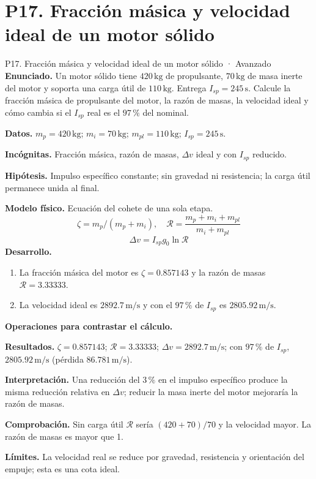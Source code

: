 \section{P17. Fracción másica y velocidad ideal de un motor sólido}
\begin{studiumworked}{P17. Fracción másica y velocidad ideal de un motor sólido · Avanzado}
\textbf{Enunciado.} Un motor sólido tiene $420\,\mathrm{kg}$ de propulsante, $70\,\mathrm{kg}$ de masa inerte del motor y soporta una carga útil de $110\,\mathrm{kg}$. Entrega $I_{sp}=245\,\mathrm s$. Calcule la fracción másica de propulsante del motor, la razón de masas, la velocidad ideal y cómo cambia si el $I_{sp}$ real es el $97\,\%$ del nominal.

\textbf{Datos.} $m_p=420\,\mathrm{kg}$; $m_i=70\,\mathrm{kg}$; $m_{pl}=110\,\mathrm{kg}$; $I_{sp}=245\,\mathrm s$.

\textbf{Incógnitas.} Fracción másica, razón de masas, $\Delta v$ ideal y con $I_{sp}$ reducido.

\textbf{Hipótesis.} Impulso específico constante; sin gravedad ni resistencia; la carga útil permanece unida al final.

\textbf{Modelo físico.} Ecuación del cohete de una sola etapa.
\[\zeta=m_p/(m_p+m_i),\quad \mathcal R=\frac{m_p+m_i+m_{pl}}{m_i+m_{pl}}\]
\[\Delta v=I_{sp}g_0\ln\mathcal R\]
\textbf{Desarrollo.}
\begin{enumerate}
\item La fracción másica del motor es $\zeta=0.857143$ y la razón de masas $\mathcal R=3.33333$.
\item La velocidad ideal es $2892.7\,\mathrm{m/s}$ y con el $97\,\%$ de $I_{sp}$ es $2805.92\,\mathrm{m/s}$.
\end{enumerate}
\textbf{Operaciones para contrastar el cálculo.}

\textbf{Resultados.} $\zeta=0.857143$; $\mathcal R=3.33333$; $\Delta v=2892.7\,\mathrm{m/s}$; con $97\,\%$ de $I_{sp}$, $2805.92\,\mathrm{m/s}$ (pérdida $86.781\,\mathrm{m/s}$).

\textbf{Interpretación.} Una reducción del $3\,\%$ en el impulso específico produce la misma reducción relativa en $\Delta v$; reducir la masa inerte del motor mejoraría la razón de masas.

\textbf{Comprobación.} Sin carga útil $\mathcal R$ sería $(420+70)/70$ y la velocidad mayor. La razón de masas es mayor que 1.

\textbf{Límites.} La velocidad real se reduce por gravedad, resistencia y orientación del empuje; esta es una cota ideal.
\end{studiumworked}
